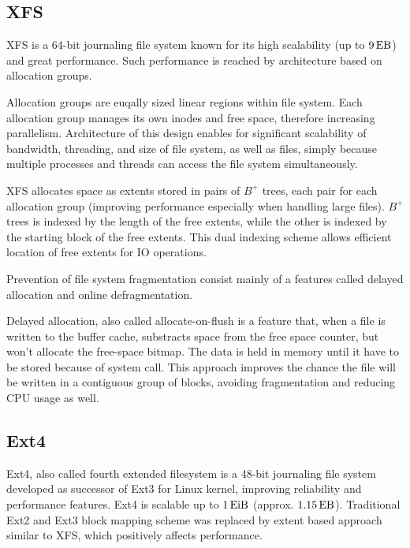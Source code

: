 \documentclass[
  color, %
  table, %
  lof,   %
  lot,   %
]{fithesis3}
\begin{document}

\subsection{XFS}
XFS is a 64-bit journaling file system known for its high scalability (up to $\SI{9}{\exa\byte}$) and great performance. Such performance is reached by architecture based on allocation groups.

Allocation groups are euqally sized linear regions within file system. Each allocation group manages its own inodes and free space, therefore increasing parallelism. Architecture of this design enables for significant scalability of bandwidth, threading, and size of file system, as well as files, simply because multiple processes and threads can access the file system simultaneously.

XFS allocates space as extents stored in pairs of $B^+$ trees, each pair for each allocation group (improving performance especially when handling large files). $B^+$ trees is indexed by the length of the free extents, while the other is indexed by the starting block of the free extents. This dual indexing scheme allows efficient location of free extents for IO operations.

Prevention of file system fragmentation consist mainly of a features called delayed allocation and online defragmentation.

Delayed allocation, also called allocate-on-flush is a feature that, when a file is written to the buffer cache, substracts space from the free space counter, but won't allocate the free-space bitmap. The data is held in memory until it have to be stored because of system call. This approach improves the chance the file will be written in a contiguous group of blocks, avoiding fragmentation and reducing CPU usage as well.

\subsection{Ext4}
Ext4, also called fourth extended filesystem is a 48-bit journaling file system developed as successor of Ext3 for Linux kernel, improving reliability and performance features. Ext4 is scalable up to $\SI{1}{\exbi\byte}$ (approx. $\SI{1.15}{\exa\byte}$). Traditional Ext2 and Ext3 block mapping scheme was replaced by extent based approach similar to XFS, which positively affects performance.
\end{document}
